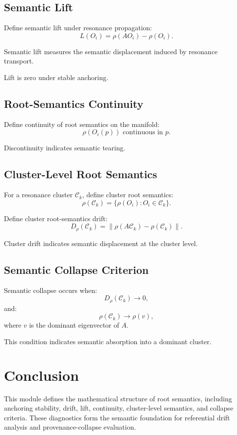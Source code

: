 \subsection{Semantic Lift}

Define semantic lift under resonance propagation:
\[
L(O_i) = \rho(A O_i) - \rho(O_i).
\]

Semantic lift measures the semantic displacement induced by resonance
transport.

Lift is zero under stable anchoring.

\subsection{Root-Semantics Continuity}

Define continuity of root semantics on the manifold:
\[
\rho(O_i(p)) \text{ continuous in } p.
\]

Discontinuity indicates semantic tearing.

\subsection{Cluster-Level Root Semantics}

For a resonance cluster $\mathcal{C}_k$, define cluster root semantics:
\[
\rho(\mathcal{C}_k) = \{ \rho(O_i) : O_i \in \mathcal{C}_k \}.
\]

Define cluster root-semantics drift:
\[
D_{\rho}(\mathcal{C}_k)
  = \left\| \rho(A \mathcal{C}_k) - \rho(\mathcal{C}_k) \right\|.
\]

Cluster drift indicates semantic displacement at the cluster level.

\subsection{Semantic Collapse Criterion}

Semantic collapse occurs when:
\[
D_{\rho}(\mathcal{C}_k) \to 0,
\]
and:
\[
\rho(\mathcal{C}_k) \to \rho(v),
\]
where $v$ is the dominant eigenvector of $A$.

This condition indicates semantic absorption into a dominant cluster.

\section{Conclusion}

This module defines the mathematical structure of root semantics, including
anchoring stability, drift, lift, continuity, cluster-level semantics, and
collapse criteria. These diagnostics form the semantic foundation for
referential drift analysis and provenance-collapse evaluation.
